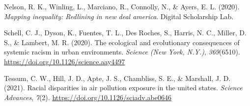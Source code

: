 \documentclass[
  english,
  jou]{apa6}
\newlength{\cslhangindent}
\newenvironment{CSLReferences}[2] %
 {\begin{list}{}{%
  \setlength{\itemindent}{0pt}
  \setlength{\leftmargin}{0pt}
  \setlength{\parsep}{0pt}
  \ifodd #1
   \setlength{\leftmargin}{\cslhangindent}
   \setlength{\itemindent}{-1\cslhangindent}
  \fi
  \setlength{\itemsep}{#2\baselineskip}}}
 {\end{list}}
\begin{document}
\begin{CSLReferences}{1}{0}
Nelson, R. K., Winling, L., Marciano, R., Connolly, N., \& Ayers, E. L. (2020). \emph{Mapping inequality: Redlining in new deal america}. Digital Scholarship Lab.

Schell, C. J., Dyson, K., Fuentes, T. L., Des Roches, S., Harris, N. C., Miller, D. S., \& Lambert, M. R. (2020). The ecological and evolutionary consequences of systemic racism in urban environments. \emph{Science (New York, N.Y.)}, \emph{369}(6510). \url{https://doi.org/10.1126/science.aay4497}

Tessum, C. W., Hill, J. D., Apte, J. S., Chambliss, S. E., \& Marshall, J. D. (2021). Racial disparities in air pollution exposure in the united states. \emph{Science Advances}, \emph{7}(2). \url{https://doi.org/10.1126/sciadv.abe0646}

\end{CSLReferences}
\end{document}
